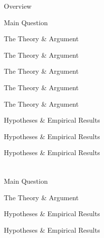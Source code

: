 \documentclass{Bredelebeamer}\usepackage[]{graphicx}\usepackage[]{color}
\begin{document}
\begin{frame}{Overview}
\begin{frame}{Main Question}
\end{frame}
\begin{frame}{The Theory \& Argument}

\end{frame}

\begin{frame}{The Theory \& Argument}

\end{frame}

\begin{frame}{The Theory \& Argument}

\end{frame}

\begin{frame}{The Theory \& Argument}

\end{frame}


\begin{frame}{The Theory \& Argument}

\end{frame}
\begin{frame}{Hypotheses \& Empirical Results}

\end{frame}	

\begin{frame}{Hypotheses \& Empirical Results}

\end{frame}


\begin{frame}{Hypotheses \& Empirical Results}

\end{frame}

\section{\cite{Debs2010}}
\begin{frame}{Main Question}

\end{frame}
\begin{frame}{The Theory \& Argument}

\end{frame}


\begin{frame}{Hypotheses \& Empirical Results}

\end{frame}

\begin{frame}{Hypotheses \& Empirical Results}


\end{frame}
\end{frame}
\end{document}
